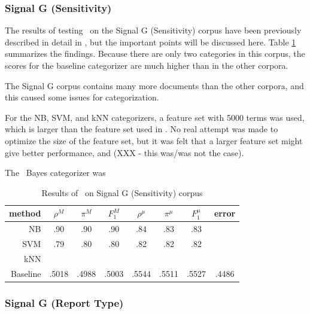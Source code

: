 \subsubsection{Signal G (Sensitivity)}

The results of testing \aicat\ on the Signal G (Sensitivity) corpus
have been previously described in detail in \cite{calvo:02}, but the
important points will be discussed here.  Table
\ref{signalg-sens-results} summarizes the findings.  Because there are
only two categories in this corpus, the scores for the baseline
categorizer are much higher than in the other corpora.

The Signal G corpus contains many more documents than the other
corpora, and this caused some issues for categorization.

For the NB, SVM, and kNN categorizers, a feature set with 5000 terms
was used, which is larger than the feature set used in
\cite{calvo:02}.  No real attempt was made to optimize the size of the
feature set, but it was felt that a larger feature set might give
better performance, and (XXX - this was/was not the case).

The \naive\ Bayes categorizer was


\begin{table}
\begin{center}
\begin{tabular}{|r c c c c c c c|}
\hline
method    & $\rho^M$ & $\pi^M$ & $F_1^M$ & $\rho^\mu$ & $\pi^\mu$ & $F_1^\mu$ &   error \\
\hline
NB        &   .90    &  .90    &  .90    &  .84       &  .83      &  .83      &         \\
SVM       &   .79    &  .80    &  .80    &  .82       &  .82      &  .82      &         \\
kNN       \\
Baseline  &   .5018  &  .4988  &  .5003  &  .5544     &  .5511    &  .5527    &  .4486  \\
\hline
\end{tabular}
\end{center}
\caption{Results of \aicat\ on Signal G (Sensitivity) corpus}
\label{signalg-sens-results}
\end{table}


\subsubsection{Signal G (Report Type)}

